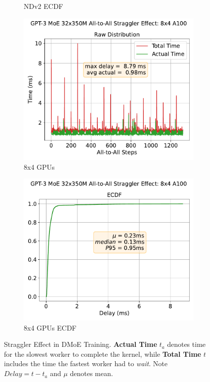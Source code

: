 \begin{figure}[!ht]
\begin{subfigure}{.5\linewidth}
        \caption{NDv2 ECDF}
        \label{sub:s_350_ecdf}
    \end{subfigure}
    \smallskip %
    \begin{subfigure}{.5\linewidth}
        \centering
        \includegraphics[width=\linewidth, keepaspectratio]{images/GPT-3_MoE_32x350M}
        \caption{8x4 GPUs}
        \label{sub:m_350}
    \end{subfigure}\hfill %
    \begin{subfigure}{.5\linewidth}
        \centering
        \includegraphics[width=\linewidth, keepaspectratio]{images/GPT-3_MoE_32x350M_ecdf}
        \caption{8x4 GPUs ECDF}
        \label{sub:m_350_ecdf}
    \end{subfigure}
    \caption{\footnotesize Straggler Effect in DMoE Training.
    \textbf{Actual Time} $t_a$ denotes time for the slowest worker to complete the kernel,
        while \textbf{Total Time} $t$ includes the time the fastest worker had to \emph{wait}.
        Note $Delay = t - t_a$ and $\mu$ denotes mean.}
    \label{fig:straggler}
\end{figure}
